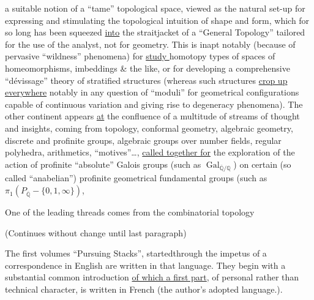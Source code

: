 a suitable notion of a ``tame'' topological space, viewed as the natural set-up for expressing and stimulating the topological intuition of shape and form, which for so long has been squeezed \uline{into} the straitjacket of a ``General Topology'' tailored for the use of the analyst, not for geometry. This is inapt notably (because of pervasive ``wildness'' phenomena) for \uline{ study } homotopy types of spaces of homeomorphisms, imbeddings \& the like, or for developing a comprehensive ``dévissage'' theory of stratified structures (whereas such structures  \uline{crop up everywhere} notably in any question of ``moduli'' for geometrical configurations capable of continuous variation and giving rise to degeneracy phenomena). The other continent appears \uline{at} the confluence of a multitude of streams of thought and insights, coming from topology, conformal geometry, algebraic geometry, discrete and profinite groups, algebraic groups over number fields, regular polyhedra, arithmetics, ``motives''\ldots, \uline{called together for} the exploration of the action of profinite ``absolute'' Galois groups (such as $\operatorname{Gal}_{\overline{\mathbb{Q}}/\mathbb{Q}}$) on certain (so called ``anabelian'') profinite geometrical fundamental groups (such as $\pi_{1}(P_{\overline{\mathbb{Q}}}-\{0,1,\infty\})$,

One of the leading threads comes from the combinatorial topology

(Continues without change until last paragraph)

The  first  volumes ``Pursuing Stacks'', started\textendash through the impetus of a correspondence in English are written in that language. They begin with a substantial common introduction \uline{of which a first part}, of personal rather than technical character, is written in French (the author's adopted language.).
